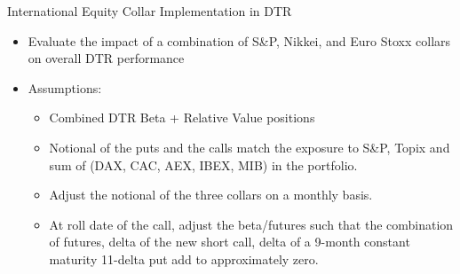 \documentclass{beamer}
\begin{document}
\begin{frame}{International Equity Collar Implementation in DTR}

\begin{itemize}

\item Evaluate the impact of a combination of S\&P, Nikkei, and Euro Stoxx collars on overall DTR performance
	\vfill
\item Assumptions:
	\vfill
	\begin{itemize}
	\item Combined DTR Beta + Relative Value positions
	\vfill
	\item Notional of the puts and the calls match the exposure to S\&P, Topix and sum of (DAX, CAC, AEX, IBEX, MIB) in the portfolio. 
	\vfill
	\item Adjust the notional of the three collars on a monthly basis.
	\vfill
	\item At roll date of the call, adjust the beta/futures such that the combination of futures, delta of the new short call, delta of a 9-month constant maturity 11-delta put add to 			approximately zero.
	\vfill	
	\end{itemize}
\end{itemize}
\end{frame}
\end{document}
